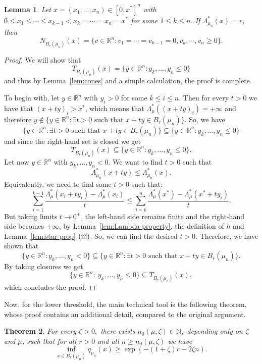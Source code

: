 \documentclass[11pt,a4paper]{article} %
\newtheorem{theorem}{Theorem}[section]
\newtheorem{lemma}[theorem]{Lemma}
\theoremstyle{definition}
\theoremstyle{remark}
\newcommand{\1}{\mathds{1}}
\newcommand{\gr}{\ge}
\begin{document}
\begin{lemma}\label{lem:hyper-bd} Let $x=(x_1,\ldots,x_n) \in [0,x^{\ast}]^n$ with $0 \leq x_1 \leq\cdots \leq x_{k-1}<x_k=\cdots=x_n=x^{\ast}$ for some $1 \leq k \leq n$. If $\Lambda_{\mu_n}^\ast(x)=r$, then $$N_{B_r(\mu_n)}(x)= \{v \in \mathbb{R}^n :v_1=\cdots=v_{k-1}=0, v_{k},\cdots,v_n \geq 0 \}.$$

\end{lemma}

\begin{proof} We will show that $$T_{B_r(\mu_n)}(x)= \{y \in \mathbb{R}^n : y_{k},\ldots,y_n \leq 0 \}$$
and thus by Lemma~\ref{lem:cones} and a simple calculation, the proof is complete.

 To begin with, let $y \in \mathbb{R}^{n}$ with $y_i>0$ for some $k \leq i \leq n$. Then for every $t>0$ we have that $(x+ty)_i>x^{\ast}$, which means that $\Lambda_{\mu}^{\ast}((x+ty)_{i})=+\infty$ and therefore $y \notin \{ y \in \mathbb{R}^n: \exists t>0 \text{ such that } x+ty\in B_r(\mu_n) \}$. So, we have $$\{ y \in \mathbb{R}^n: \exists t>0 \text{ such that } x+ty\in B_r(\mu_n) \} \subseteq \{y \in \mathbb{R}^n : y_{k},\ldots,y_n \leq 0 \}$$
and since the right-hand set is closed we get $$T_{B_r(\mu_n)}(x) \subseteq\{y \in \mathbb{R}^n : y_{k},\ldots,y_n \leq 0 \}.$$
Let now $y \in \mathbb{R}^n$ with $y_{k},\ldots,y_n<0$. We want to find $t>0$ such that $$\Lambda_{\mu_{n}}^{\ast}(x+ty) \leq \Lambda_{\mu_{n}}^{\ast}(x).$$
Equivalently, we need to find some $t>0$ such that:
$$\sum\limits_{i=1}^{k-1} \frac{\Lambda_{\mu}^{\ast}(x_i+ty_i)-\Lambda_{\mu}^{\ast}(x_i)}{t} \leq \sum\limits_{i=k}^{n} \frac{\Lambda_{\mu}^{\ast}(x^{\ast})-\Lambda_{\mu}^{\ast}(x^{\ast}+ty_i)}{t}.$$
But taking limits $t \to 0^{+}$, the left-hand side remains finite and the  right-hand side becomes $+\infty$, by Lemma~\ref{lem:Lambda-property}, the definition of $h$ and Lemma~\ref{lem:star-prop} ${\rm (iii)}$. So, we can find the desired $t>0$. Therefore, we have shown that $$\{y \in \mathbb{R}^n: y_k,\ldots,y_n <0\} \subseteq \{ y \in \mathbb{R}^n: \exists t>0 \text{ such that } x+ty\in B_r(\mu_n) \}.$$
By taking closures we get 
\[
\{y\in\mathbb{R}^n:\ y_k,\ldots,y_n\le 0\}\subseteq T_{B_r(\mu_n)}(x),
\]
which concludes the proof.
\end{proof}

Now, for the lower threshold, the main technical tool is the following theorem, whose proof contains an additional detail, compared to the original argument.

\begin{theorem}
    For every $\zeta >0,$ there exists $n_0(\mu,\zeta)\in\mathbb{N},$ depending only on $\zeta$
and $\mu$, such that for all $r>0$ and all $n\gr n_0(\mu,\zeta)$ we have 
$$\inf_{x\in B_r(\mu_n)}q_{\mu_n }(x)\gr\exp (-(1+\zeta)r-2\zeta n).$$
\end{theorem}
\end{document}
